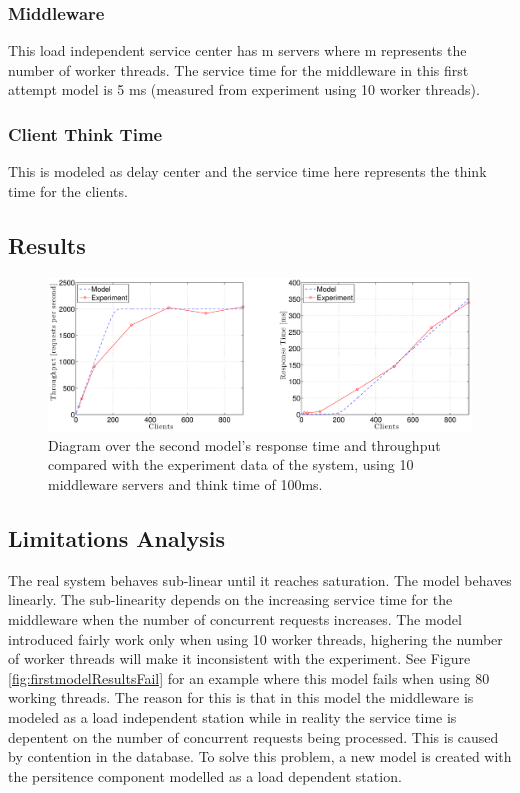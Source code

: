 \documentclass[a4paper, 11pt]{article}
\begin{document}
		\subsubsection{Middleware}
		This load independent service center has m servers where m represents the number of worker threads. The service time for the middleware in this first attempt model is 5 ms (measured from experiment using 10 worker threads).

		\subsubsection{Client Think Time}
		This is modeled as delay center and the service time here represents the think time for the clients.

	\subsection{Results}
	\begin{figure}[cht!]
		\centering
			\includegraphics[width=1\linewidth,keepaspectratio]{firstRealAndModelRespAndThroughput}
		\caption{Diagram over the second model's response time and throughput compared with the experiment data of the system, using 10 middleware servers and think time of 100ms.}
		\label{fig:firstmodelResults}
	\end{figure}
	\FloatBarrier

	\subsection{Limitations Analysis}
		The real system behaves sub-linear until it reaches saturation. The model behaves linearly. The sub-linearity depends on the increasing service time for the middleware when the number of concurrent requests increases. 
		The model introduced fairly work only when using 10 worker threads, highering the number of worker threads will make it inconsistent with the experiment. See Figure \ref{fig:firstmodelResultsFail} for an example where this model fails when using 80 working threads. The reason for this is that in this model the middleware is modeled as a load independent station while in reality the service time is depentent on the number of concurrent requests being processed. This is caused by contention in the database. To solve this problem, a new model is created with the persitence component modelled as a load dependent station.
\end{document}
